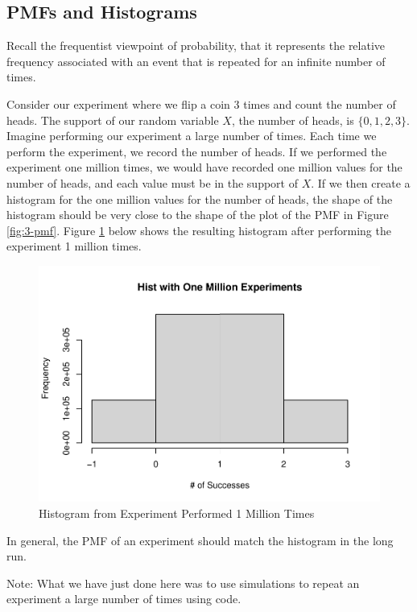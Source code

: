 \documentclass[
]{book}
\begin{document}
\subsection{PMFs and Histograms}\label{pmfs-and-histograms}

Recall the frequentist viewpoint of probability, that it represents the relative frequency associated with an event that is repeated for an infinite number of times.

Consider our experiment where we flip a coin 3 times and count the number of heads. The support of our random variable \(X\), the number of heads, is \(\{0,1,2,3 \}\). Imagine performing our experiment a large number of times. Each time we perform the experiment, we record the number of heads. If we performed the experiment one million times, we would have recorded one million values for the number of heads, and each value must be in the support of \(X\). If we then create a histogram for the one million values for the number of heads, the shape of the histogram should be very close to the shape of the plot of the PMF in Figure \ref{fig:3-pmf}. Figure \ref{fig:3-sim} below shows the resulting histogram after performing the experiment 1 million times.

\begin{figure}
\centering
\includegraphics{bookdown-demo_files/figure-latex/3-sim-1.pdf}
\caption{\label{fig:3-sim}Histogram from Experiment Performed 1 Million Times}
\end{figure}

In general, the PMF of an experiment should match the histogram in the long run.

Note: What we have just done here was to use simulations to repeat an experiment a large number of times using code.
\end{document}
